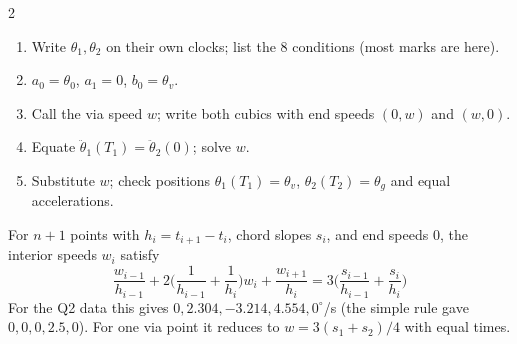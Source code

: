 \begin{multicols}{2}
\begin{recipe}
\begin{enumerate}
\item Write $\theta_1,\theta_2$ on their own clocks; list the 8 conditions (most marks are here).
\item $a_0=\theta_0$, $a_1=0$, $b_0=\theta_v$.
\item Call the via speed $w$; write both cubics with end speeds $(0,w)$ and $(w,0)$.
\item Equate $\ddot\theta_1(T_1)=\ddot\theta_2(0)$; solve $w$.
\item Substitute $w$; check positions $\theta_1(T_1)=\theta_v$, $\theta_2(T_2)=\theta_g$ and equal accelerations.
\end{enumerate}
\end{recipe}
\begin{fbx}
For $n{+}1$ points with $h_i=t_{i+1}-t_i$, chord slopes $s_i$, and end speeds $0$, the interior speeds $w_i$ satisfy
\[\frac{w_{i-1}}{h_{i-1}}+2\Big(\frac1{h_{i-1}}+\frac1{h_i}\Big)w_i+\frac{w_{i+1}}{h_i}=3\Big(\frac{s_{i-1}}{h_{i-1}}+\frac{s_i}{h_i}\Big)\]
For the Q2 data this gives $0,2.304,-3.214,4.554,0^\circ$/s (the simple rule gave $0,0,0,2.5,0$). For one via point it reduces to $w=3(s_1+s_2)/4$ with equal times. \chk
{}
\end{fbx}


\end{multicols}
